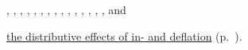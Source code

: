 
\scriptsize{
	,
	,
	,
	,
	,
	,	
	,
	,
	,
	,
	,
	,
	,
	,
	,
	 and

	\hyperref[sec:distributive-effects-of-inflation]{the distributive effects of in- and deflation} (p.~\pageref{sec:distributive-effects-of-inflation}).
}